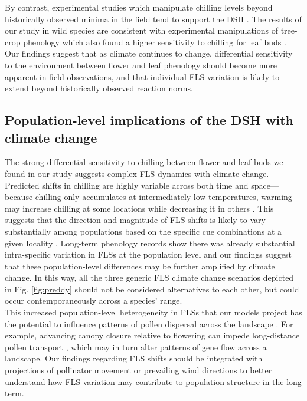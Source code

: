 \documentclass[11pt]{article}\usepackage[]{graphicx}\usepackage[]{color}
\begin{document}
\noindent By contrast, experimental studies which manipulate chilling levels beyond historically observed minima in the field tend to support the DSH \citep[e.g.][]{Aslani2009,Gariglio2006}. The results of our study in wild species are consistent with experimental manipulations of tree-crop phenology which also found a higher sensitivity to chilling for leaf buds \citep{Gariglio2006,Citadin2001}. Our findings suggest that as climate continues to change, differential sensitivity to the environment between flower and leaf phenology should become more apparent in field observations, and that individual FLS variation is likely to extend beyond historically observed reaction norms.\\

\subsection*{Population-level implications of the DSH with climate change}
\noindent The strong differential sensitivity to chilling between flower and leaf buds we found in our study suggests complex FLS dynamics with climate change. Predicted shifts in chilling are highly variable across both time and space---because chilling only accumulates at intermediately low temperatures, warming may increase chilling at some locations while decreasing it in others \citep{Man2017,Zhang:2007aa}. This suggests that the direction and magnitude of FLS shifts is likely to vary substantially among populations based on the specific cue combinations at a given locality \citep{Chmielewski:2012aa}. Long-term phenology records show there was already substantial intra-specific variation in FLSs at the population level \citep{Buonaiuto2020} and our findings suggest that these population-level differences may be further amplified by climate change. In this way, all the three generic FLS climate change scenarios depicted in Fig. \ref{fig:preddy} should not be considered alternatives to each other, but could occur contemporaneously across a species' range. \\ 

\noindent This increased population-level heterogeneity in FLSs that our models project has the potential to influence patterns of pollen dispersal across the landscape \citep{Borycka2017,Pace:2018aa}. For example, advancing canopy closure relative to flowering can impede long-distance pollen transport \citep{Milleron2012}, which may in turn alter patterns of gene flow across a landscape. Our findings regarding FLS shifts should be integrated with projections of pollinator movement or prevailing wind directions \citep{Kling:2020aa} to better understand how FLS variation may contribute to population structure in the long term. \\
\end{document}
